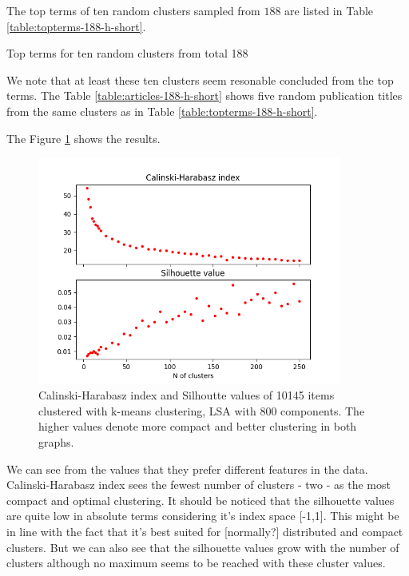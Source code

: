 The top terms of ten random clusters sampled from $188$ are listed
in Table \ref{table:topterms-188-h-short}.
\begin{table}[ht]
  \begin{center}
    
    \caption{Top terms for ten random clusters from total 188}
    \label{table:topterms-188-h-short}    
 \end{center}
\end{table}
We note that at least these ten clusters seem resonable concluded
from the top terms. The Table \ref{table:articles-188-h-short} 
shows five random publication 
titles from the same clusters as in Table \ref{table:topterms-188-h-short}.




The Figure \ref{fig:ch-silh-full-h} shows the results.
\begin{figure}[ht]
  \begin{center}    
\includegraphics[width=10cm]{images/c-h-silh-index-plot-y2000-2_260-800-kmeans.png}
    \caption{Calinski-Harabasz index and Silhoutte values of 
10145 items clustered with k-means clustering, LSA with 800 
components. The higher values denote more compact and better 
clustering in both graphs.}
    \label{fig:ch-silh-full-h}
  \end{center}
\end{figure}

We can see from the values that they prefer different features in
the data. Calinski-Harabasz index sees the fewest number of 
clusters - two - as the most compact and optimal clustering. 
It should be noticed that the silhouette values are quite low 
in absolute terms considering it's index space [-1,1]. This might 
be in line with the fact that it's best suited for [normally?] 
distributed and compact clusters. But we can also see that the 
silhouette values grow with the number of clusters although no
maximum seems to be reached with these cluster values.


